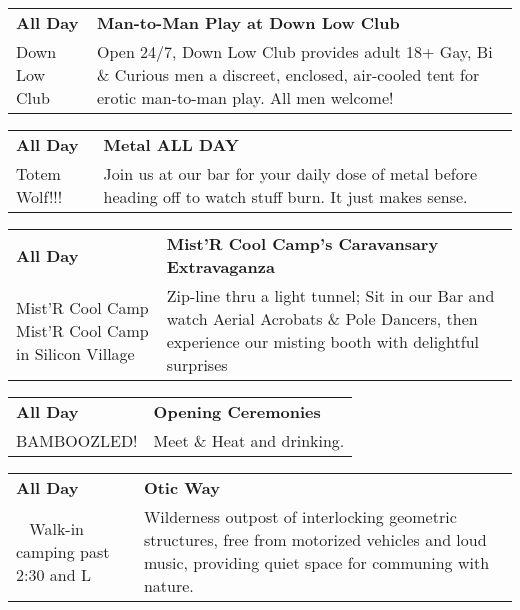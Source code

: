 \begin{tabular}{ p{1in} p{2.2in} }
    \textbf{All Day} & \textbf{Man-to-Man Play at Down Low Club} \\
    Down Low Club \newline  & Open 24/7, Down Low Club provides adult 18+ Gay, Bi \& Curious men a discreet, enclosed, air-cooled tent for erotic man-to-man play. All men welcome! \\
    \hline 
\end{tabular}
    
\begin{tabular}{ p{1in} p{2.2in} }
    \textbf{All Day} & \textbf{Metal ALL DAY } \\
    Totem Wolf!!! \newline  & Join us at our bar for your daily dose of metal before heading off to watch stuff burn. It just makes sense. \\
    \hline 
\end{tabular}
    
\begin{tabular}{ p{1in} p{2.2in} }
    \textbf{All Day} & \textbf{Mist'R Cool Camp's Caravansary Extravaganza} \\
    Mist'R Cool Camp \newline Mist'R Cool Camp in Silicon Village & Zip-line thru a light tunnel; Sit in our Bar and watch Aerial Acrobats \& Pole Dancers, then experience our misting booth with delightful surprises \\
    \hline 
\end{tabular}
    
\begin{tabular}{ p{1in} p{2.2in} }
    \textbf{All Day} & \textbf{Opening Ceremonies} \\
    BAMBOOZLED! \newline  & Meet \& Heat and drinking. \\
    \hline 
\end{tabular}
    
\begin{tabular}{ p{1in} p{2.2in} }
    \textbf{All Day} & \textbf{Otic Way} \\
    ~ \newline Walk-in camping past 2:30 and L & Wilderness outpost of interlocking geometric structures, free from motorized vehicles and loud music, providing quiet space for communing with nature. \\
    \hline 
\end{tabular}
    
